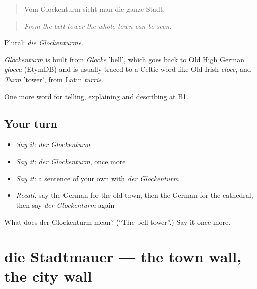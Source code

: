 \begin{quote}
Vom Glockenturm sieht man die ganze Stadt.
\end{quote}

\begin{quote}
\emph{From the bell tower the whole town can be seen.}
\end{quote}

Plural: \emph{die Glockentürme}.

\begin{cousinweb}
\emph{Glockenturm} is built from \emph{Glocke} 'bell', which goes back to Old High German \emph{glocca} (EtymDB) and is usually traced to a Celtic word like Old Irish \emph{clocc}, and \emph{Turm} 'tower', from Latin \emph{turris}.
\end{cousinweb}

\begin{grammarlens}[title={What you've built}]
One more word for telling, explaining and describing at B1.
\end{grammarlens}

\subsection*{Your turn}
\begin{itemize}
\raggedright
  \item \emph{Say it:} \emph{der Glockenturm}
  \item \emph{Say it:} \emph{der Glockenturm}, once more
  \item \emph{Say it:} a sentence of your own with \emph{der Glockenturm}
  \item \emph{Recall:} say the German for the old town, then the German for the cathedral, then say \emph{der Glockenturm} again
\end{itemize}

\begin{tcolorbox}[breakable,colback=teal!4,colframe=teal!35!black,title={Before you move on}]
What does der Glockenturm mean? (\textquotedblleft{}The bell tower\textquotedblright{}.) Say it once more.
\end{tcolorbox}
\section[die Stadtmauer]{die Stadtmauer — the town wall, the city wall}

\label{lesson:GE-C438-stadtmauer}



